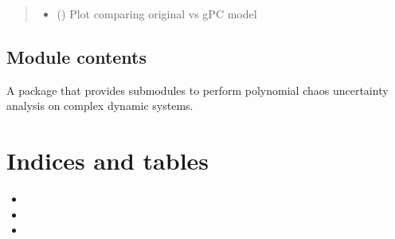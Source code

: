 \documentclass[letterpaper,10pt,english,openany,oneside]{sphinxmanual}
\begin{document}
\begin{fulllineitems}
\begin{quote}
\begin{description}
\begin{itemize}
\item {} 
 () \textendash{} Plot comparing original vs gPC model

\end{itemize}


\end{description}\end{quote}

\end{fulllineitems}



\section{Module contents}
\label{\detokenize{pygpc:module-pygpc}}\label{\detokenize{pygpc:module-contents}}
A package that provides submodules to perform polynomial chaos uncertainty analysis on complex dynamic systems.


\chapter{Indices and tables}
\label{\detokenize{index:indices-and-tables}}\begin{itemize}
\item {} 

\item {} 

\item {} 

\end{itemize}
\end{document}
